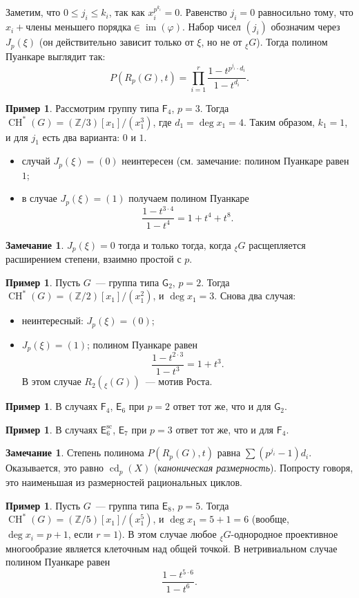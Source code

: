 \documentclass[a4paper]{article}
\DeclareMathOperator{\im}{im}
\DeclareMathOperator{\CH}{CH}
\newcommand{\ph}{\varphi}
\theoremstyle{definition}
\newtheorem{example}[theorem]{Пример}
\newtheorem{remark}[theorem]{Замечание}
\begin{document}
Заметим, что $0\leq j_i \leq k_i$, так как $x_i^{p^{k_i}} = 0$.
Равенство $j_i = 0$ равносильно тому, что
$x_i + \mbox{члены меньшего порядка}\in\im(\ph)$.
Набор чисел $(j_i)$ обозначим через $J_p(\xi)$
(он действительно зависит только от $\xi$, но не от ${}_{\xi}G$).
Тогда полином Пуанкаре выглядит так:
\[
P(R_p(G), t) = \prod_{i=1}^r\frac{1-t^{p^{j_i}\cdot d_i}}{1-t^{d_i}}.
\]
\begin{example}
Рассмотрим группу типа $\mathsf{F}_4$, $p=3$.
Тогда $\CH^*(G) = (\mathbb{Z}/3)[x_1]/(x_1^3)$,
где $d_1 = \deg x_1 = 4$.
Таким образом, $k_1=1$, и для $j_1$ есть два варианта: $0$ и $1$.
\begin{itemize}
\item случай $J_p(\xi) = (0)$ неинтересен
(см. замечание: полином Пуанкаре равен $1$;
\item в случае $J_p(\xi) = (1)$ получаем полином Пуанкаре
\[\frac{1-t^{3\cdot 4}}{1-t^4} = 1 + t^4 + t^8.\]
\end{itemize}
\end{example}
\begin{remark}
$J_p(\xi) = 0$ тогда и только тогда, когда ${}_{\xi}G$ расщепляется
расширением степени, взаимно простой с $p$.
\end{remark}

\begin{example}
Пусть $G$~--- группа типа $\mathsf{G}_2$, $p=2$.
Тогда $\CH^*(G) = (\mathbb{Z}/2)[x_1]/(x_1^2)$, и $\deg x_1 = 3$.
Снова два случая:
\begin{itemize}
\item неинтересный: $J_p(\xi) = (0)$;
\item $J_p(\xi) = (1)$; полином Пуанкаре равен
\[\frac{1-t^{2\cdot 3}}{1-t^3} = 1 + t^3.\]
В этом случае $R_2({}_{\xi}(G))$~--- мотив Роста.
\end{itemize}
\end{example}
\begin{example}
В случаях $\mathsf{F}_4$, $\mathsf{E}_6$ при $p=2$ ответ тот же,
что и для $\mathsf{G}_2$.
\end{example}
\begin{example}
В случаях $\mathsf{E}_6^{\operatorname{sc}}$, $\mathsf{E}_7$
при $p=3$ ответ тот же, что и для $\mathsf{F}_4$.
\end{example}
\begin{remark}
Степень полинома $P(R_p(G), t)$ равна $\sum (p^{j_i}-1)d_i$.
Оказывается, это равно $\operatorname{cd}_p(X)$ (\emph{каноническая размерность}).
Попросту говоря, это наименьшая из размерностей рациональных циклов.
\end{remark}
\begin{example}
Пусть $G$~--- группа типа $\mathsf{E}_8$, $p=5$.
Тогда $\CH^*(G) = (\mathbb{Z}/5)[x_1]/(x_1^5)$,
и $\deg x_1 = 5+1 = 6$ (вообще, $\deg x_i = p+1$, если $r=1$).
В этом случае любое ${}_{\xi}G$-однородное проективное многообразие
является клеточным над общей точкой.
В нетривиальном случае полином Пуанкаре равен
\[
\frac{1-t^{5\cdot 6}}{1-t^6}.
\]
\end{example}
\end{document}
